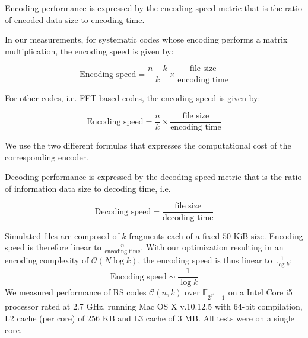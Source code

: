 \documentclass[oneside,9pt]{article}
\newcommand{\bigo}[1]{ \mathcal{O}(#1) }
\newcommand{\ec}[2]{ \mathcal{C}(#1, #2) }
\newcommand{\gf}[2][]{ \mathbb{F}_{{#2}^{#1}} }
\newcommand{\fftl}{N}
\begin{document}
Encoding performance is expressed by the encoding speed metric that is the ratio of encoded data size to encoding time.

In our measurements, for systematic codes whose encoding performs a matrix multiplication, the encoding speed is given by:

\begin{equation}\label{eq:enc_metric_def_sys}
\text{Encoding speed} =  \frac{ n - k }{ k } \times  \frac{ \text{file size}  }{ \text{encoding time} }
\end{equation}

For other codes, i.e. FFT-based codes, the encoding speed is given by:

\begin{equation}\label{eq:enc_metric_def}
\text{Encoding speed} =  \frac{ n }{ k } \times  \frac{ \text{file size}  }{ \text{encoding time} }
\end{equation}

We use the two different formulas that expresses the computational cost of the corresponding encoder.

Decoding performance is expressed by the decoding speed metric that is the ratio of information data size to decoding time, i.e.

\begin{equation}\label{eq:dec_metric_def}
\text{Decoding speed} =  \frac{ \text{file size}  }{ \text{decoding time} }
\end{equation}

Simulated files are composed of $k$ fragments each of a fixed  $50$-KiB size. Encoding speed is therefore linear to $\frac{n}{\text{encoding time}}$. With our optimization resulting in an encoding complexity of $\bigo{\fftl \log{k}}$, the encoding speed is thus linear to $\frac{1}{\log{k}}$:
\begin{equation}\label{eq:enc_metric_on_k}
\text{Encoding speed} \sim  \frac{ 1 }{ \log{k} }
\end{equation}
We measured performance of RS codes $\ec{n}{k}$ over $\gf{2^{2^4}+1}$ on a Intel Core i5 processor rated at 2.7 GHz, running Mac OS X v.10.12.5 with 64-bit compilation, L2 cache (per core) of 256 KB and L3 cache of 3 MB. All tests were on a single core.
% 
% 
\end{document}
